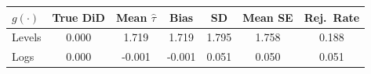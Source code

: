 \begin{tabular}{lcccccc}
  \toprule
$g(\cdot)$ & True DiD & Mean $\hat{\tau}$ & Bias & SD & Mean SE & Rej.\ Rate \\ 
  \midrule
Levels & 0.000 & 1.719 & 1.719 & 1.795 & 1.758 & 0.188 \\ 
  Logs & 0.000 & -0.001 & -0.001 & 0.051 & 0.050 & 0.051 \\ 
   \bottomrule
\end{tabular}
